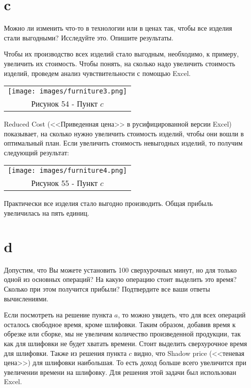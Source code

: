 \documentclass[12pt]{article}
\theoremstyle{definition}
\theoremstyle{remark}
\begin{document}
\section*{c}
Можно ли изменить что-то в технологии или в ценах так, чтобы все изделия стали выгодными? Исследуйте это. Опишите результаты.

Чтобы их производство всех изделий стало выгодным, необходимо, к примеру, увеличить их стоимость. Чтобы понять, на сколько надо увеличить стоимость изделий, проведем анализ чувствительности с помощью Excel.

\begin{center}
  \begin{tabular}{c}
\texttt{[image: images/furniture3.png]}\\
Рисунок 54 - Пункт $c$
\end{tabular}
\end{center}

Reduced Cost (<<Приведенная цена>> в русифицированной версии Excel) показывает, на сколько нужно увеличить стоимость изделий, чтобы они вошли в оптимальный план. Если увеличить стоимость невыгодных изделий, то получим следующий результат:

\begin{center}
  \begin{tabular}{c}
\texttt{[image: images/furniture4.png]}\\
Рисунок 55 - Пункт $c$
\end{tabular}
\end{center}

Практически все изделия стало выгодно производить. Общая прибыль увеличилась на пять единиц.


\section*{d}
Допустим, что Вы можете установить 100 сверхурочных минут, но для только одной из основных операций? На какую операцию стоит выделить это время? Сколько при этом получится прибыли? Подтвердите все ваши ответы вычислениями.

Если посмотреть на решение пункта $a$, то можно увидеть, что для всех операций осталось свободное время, кроме шлифовки. Таким образом, добавив время к обрезке или сборке, мы не увеличим количество произведенной продукции, так как для шлифовки не будет хватать времени. Стоит выделить сверхурочное время для шлифовки. Также из решения пункта $c$ видно, что Shadow price (<<теневая цена>>) для шлифовки наибольшая. То есть доход больше всего увеличится при увеличении времени на шлифовку. Для решения этой задачи был использован Excel.
\end{document}

